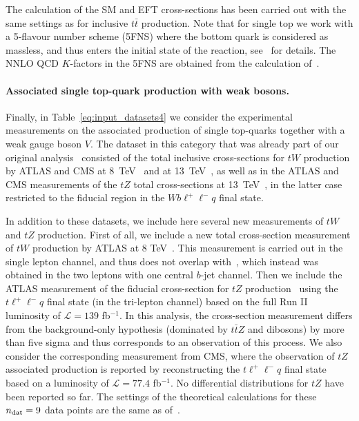 The calculation of the SM and EFT cross-sections has been carried out with the
same settings as for inclusive $t\bar{t}$ production. Note that for single top
we work with a 5-flavour number scheme (5FNS) where the bottom quark is
considered as massless, and thus enters the initial state of the reaction,
see~\cite{Nocera:2019wyk} for details.
%
The NNLO QCD $K$-factors in the 5FNS are
obtained from the calculation of~\cite{Berger:2016oht}.

\paragraph{Associated single top-quark production with weak bosons.}
Finally, in Table~\ref{eq:input_datasets4} we consider the experimental
measurements on the associated production of single top-quarks together with
a weak gauge boson $V$.
%
The dataset in this category that was already part of our
original analysis~\cite{Hartland:2019bjb} consisted of the total inclusive
cross-sections for $tW$ production by ATLAS and CMS at
8~TeV~\cite{Aad:2015eto,Chatrchyan:2014tua}
and at 13~TeV~\cite{Aaboud:2016lpj,Sirunyan:2018lcp},
as well as in the ATLAS and CMS measurements of the $tZ$ total
cross-sections at 13~TeV~\cite{Sirunyan:2017nbr,Aaboud:2017ylb},
in the latter case restricted to the fiducial region
in the $Wb\ell^+\ell^-q$ final state.



In addition to these datasets, we include here several new measurements
of $tW$ and $tZ$ production.
First of all, we include a new total cross-section measurement of
$tW$ production by ATLAS at 8 TeV~\cite{Aad:2020zhd}.
This measurement is carried out in the single lepton channel, and thus does
not overlap with~\cite{Aad:2015eto}, which instead was obtained
in the two leptons with one central $b$-jet channel.
Then we include the ATLAS measurement of the fiducial cross-section
for $tZ$ production~\cite{Aad:2020wog} using the $t \ell^+\ell^- q$ final state
(in the tri-lepton channel) based on the full Run II luminosity of
$\mathcal{L}=139$ fb$^{-1}$. In this analysis, the cross-section measurement
differs from the background-only hypothesis
(dominated by $t\bar{t}Z$ and dibosons) by more than five sigma and thus
corresponds to an observation of this process.
%
We also consider the corresponding measurement from CMS,
where the observation of $tZ$ associated production
is reported by reconstructing the $t\ell^+\ell^-q$
final state~\cite{Sirunyan:2018zgs}
based on a luminosity of $\mathcal{L}=77.4$ fb$^{-1}$.
No differential distributions for $tZ$ have been reported so far.
The settings of the theoretical calculations for these
$n_{\rm dat}=9$ data points are the same as of~\cite{Hartland:2019bjb}.

